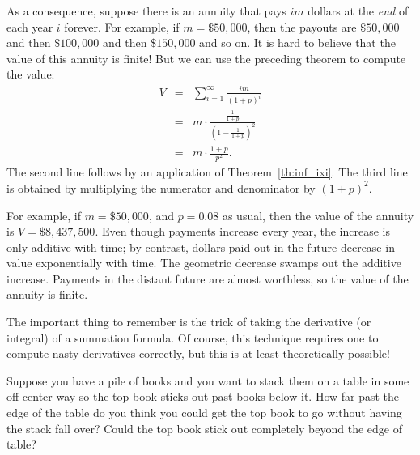 As a consequence, suppose there is an annuity that pays $im$ dollars
at the {\em end} of each year $i$ forever.  For example, if $m =
\$50,000$, then the payouts are $\$50,000$ and then $\$100,000$ and
then $\$150,000$ and so on.  It is hard to believe that the value of
this annuity is finite!  But we can use the preceding theorem to
compute the value:
\begin{eqnarray*}
V & = & \sum_{i=1}^\infty \frac{im}{(1+p)^i} \\
  & = & m \cdot \frac{\frac{1}{1+p}}{(1 - \frac{1}{1+p})^2} \\
  & = & m \cdot \frac{1+p}{p^2}.
\end{eqnarray*}
The second line follows by an application of Theorem~\ref{th:inf_ixi}.
The third line is obtained by multiplying the numerator and
denominator by $(1+p)^2$.

For example, if $m = \$50,000$, and $p = 0.08$ as usual, then the
value of the annuity is $V = \$8,437,500$.  Even though payments
increase every year, the increase is only additive with time; by
contrast, dollars paid out in the future decrease in value
exponentially with time.  The geometric decrease swamps out the
additive increase.  Payments in the distant future are almost
worthless, so the value of the annuity is finite.

The important thing to remember is the trick of taking the derivative
(or integral) of a summation formula.  Of course, this technique
requires one to compute nasty derivatives correctly, but this is at
least theoretically possible!
\fi

\begin{problems}

\classproblems
{}

\homeworkproblems
{}

\end{problems}

\label{book_stacking_sec}

Suppose you have a pile of books and you want to stack them on a table in
some off-center way so the top book sticks out past books below it.  How
far past the edge of the table do you think you could get the top book to
go without having the stack fall over?  Could the top book stick out
completely beyond the edge of table?

